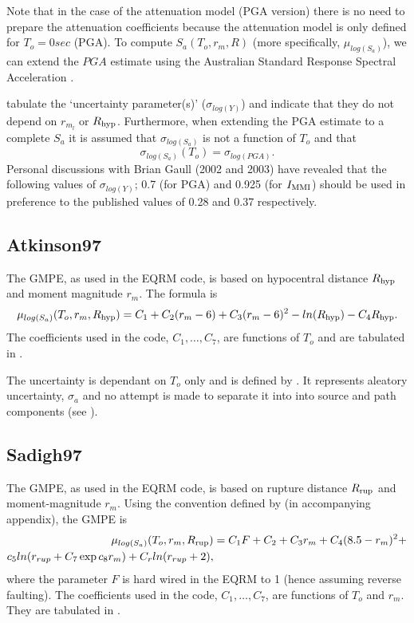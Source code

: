 Note that in the case of the \citet{dr_Gaull90a} attenuation model
(PGA version) there is no need to prepare the attenuation
coefficients because the attenuation model is only defined for
$T_o=0 sec$ (PGA). To compute $S_a(T_o,r_m,R)$ (more specifically,
$\mu_{log(S_a)}$), we can extend the $PGA$ estimate using the
Australian Standard Response Spectral Acceleration
\citep{dr_Standards93a}.

\citet[Table 4]{dr_Gaull90a} tabulate the `uncertainty
parameter(s)' ($\sigma_{log(Y)}$) and indicate that they do not
depend on $r_{m_l}$ or $\Rhyp$. Furthermore, when extending the
PGA estimate to a complete $S_a$ it is assumed that
$\sigma_{log(S_a)}$ is not a function of $T_o$ and that
\begin{equation}
\sigma_{log(S_a)}(T_o) = \sigma_{log(PGA)}.
\end{equation}
Personal discussions with Brian Gaull (2002 and 2003) have
revealed that the following values of $\sigma_{log(Y)}$; 0.7 (for
PGA) and 0.925 (for $\Imm$) should be used in preference to the
published values of 0.28 and 0.37 respectively.


\subsection{Atkinson97}

The \cite{dr_Atkinson97a} GMPE, as used in the EQRM code, is based
on hypocentral distance $\Rhyp$ and moment magnitude $r_m$. The
formula is
\begin{equation}
\mu_{log(S_a)}(T_o,r_m,\Rhyp) = C_1 + C_2(r_m-6) + C_3(r_m-6)^2
-ln(\Rhyp)-C_4\Rhyp.
\end{equation}
The coefficients used in the code, $C_1,\ldots,C_7$, are functions
of $T_o$ and are tabulated in \citet[Table 1]{dr_Atkinson97a}.

The uncertainty is dependant on $T_o$ only and is defined by
\citet{dr_Atkinson95b}. It represents aleatory uncertainty,
$\sigma_a$ and no attempt is made to separate it into into source
and path components (see \citealt[Table 2]{dr_Atkinson95b}).


\subsection{Sadigh97}

The \cite{dr_Sadigh97a} GMPE, as used in the EQRM code, is based on
rupture distance $\Rrup$ and moment-magnitude $r_m$. Using the
convention defined by \citet{dr_Campbell03a} (in accompanying
appendix), the GMPE is
\begin{equation}
\begin{split}
\mu_{log(S_a)}(T_o,r_m,\Rrup) & = C_1F +C_2 + C_3r_m
+C_4(8.5-r_m)^2 + \\ c_5ln(r_{rup}+C_7\exp{c_8r_m}) +
C_rln(r_{rup}+2),
\end{split}
\end{equation}
where the parameter $F$ is hard wired in the EQRM to 1 (hence
assuming reverse faulting). The coefficients used in the code,
$C_1,\ldots,C_7$, are functions of $T_o$ and $ r_m$. They are
tabulated in \citet[Table 2]{dr_Sadigh97a}.

